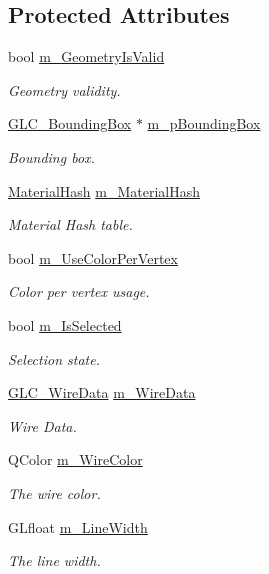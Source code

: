 \subsection*{Protected Attributes}
\begin{DoxyCompactItemize}
\item 
bool \hyperlink{class_g_l_c___geometry_a57d34d32ce14d0306f5dd3842df9c388}{m\-\_\-\-Geometry\-Is\-Valid}
\begin{DoxyCompactList}\small\item\em Geometry validity. \end{DoxyCompactList}\item 
\hyperlink{class_g_l_c___bounding_box}{G\-L\-C\-\_\-\-Bounding\-Box} $\ast$ \hyperlink{class_g_l_c___geometry_ae9b89451a9b289e149291457f57cb4b1}{m\-\_\-p\-Bounding\-Box}
\begin{DoxyCompactList}\small\item\em Bounding box. \end{DoxyCompactList}\item 
\hyperlink{glc__geometry_8h_ae24850fa84cec61db187db5ff78e789d}{Material\-Hash} \hyperlink{class_g_l_c___geometry_acb2ad674efd0f3570ed46ea7b2f8c785}{m\-\_\-\-Material\-Hash}
\begin{DoxyCompactList}\small\item\em Material Hash table. \end{DoxyCompactList}\item 
bool \hyperlink{class_g_l_c___geometry_aed849aee431089cfef5d95f32e58f280}{m\-\_\-\-Use\-Color\-Per\-Vertex}
\begin{DoxyCompactList}\small\item\em Color per vertex usage. \end{DoxyCompactList}\item 
bool \hyperlink{class_g_l_c___geometry_a4bbe6549341cc283823dcfada2c4a50c}{m\-\_\-\-Is\-Selected}
\begin{DoxyCompactList}\small\item\em Selection state. \end{DoxyCompactList}\item 
\hyperlink{class_g_l_c___wire_data}{G\-L\-C\-\_\-\-Wire\-Data} \hyperlink{class_g_l_c___geometry_a31ededa962f934a0ffae555f3fbcd275}{m\-\_\-\-Wire\-Data}
\begin{DoxyCompactList}\small\item\em Wire Data. \end{DoxyCompactList}\item 
Q\-Color \hyperlink{class_g_l_c___geometry_aeda25b917629cdade9d9657f552a7884}{m\-\_\-\-Wire\-Color}
\begin{DoxyCompactList}\small\item\em The wire color. \end{DoxyCompactList}\item 
G\-Lfloat \hyperlink{class_g_l_c___geometry_a31511ef60a51db346c82971cd1132f3c}{m\-\_\-\-Line\-Width}
\begin{DoxyCompactList}\small\item\em The line width. \end{DoxyCompactList}\end{DoxyCompactItemize}
